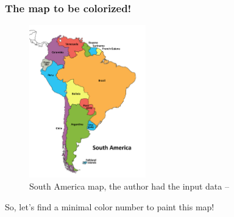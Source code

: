 \documentclass{beamer}
\begin{document}
\begin{frame}[fragile] 

		\frametitle{The map to be colorized!}
	
\begin{figure}[tbp]
  \centering
    \includegraphics[width=0.45\textwidth , height=0.54\textheight] {south_america.png}
   \caption{South America map, the author had the input data --  \Smiley{}}
	
	\end{figure}
	
\pause
So, let's find a minimal color number to paint this map!
	\end{frame}


\end{document}
